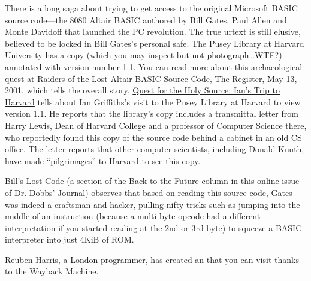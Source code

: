 There is a long saga about trying to get access to the original
Microsoft BASIC source code---the 8080 Altair BASIC authored by Bill
Gates, Paul Allen and Monte Davidoff that launched the PC revolution.
The true urtext is still elusive, believed to be locked in Bill Gates's
personal safe.
The Pusey Library at Harvard University has a copy (which you may
inspect but not photograph\ldots{}WTF?) annotated with version number
1.1.
You can read more about this archaeological quest at
\href{http://www.theregister.co.uk/2001/05/13/raiders_of_the_lost_altair/}{Raiders
of the Lost Altair BASIC Source Code}, The Register, May 13, 2001,
which tells the overall story.
\href{http://www.interact-sw.co.uk/altair/other\%20versions/ian.htm}{Quest
for the Holy Source: Ian's Trip to Harvard} tells about Ian
Griffiths's visit to the Pusey Library at Harvard to view version
1.1.
He reports that the library's copy includes a transmittal letter from
Harry Lewis, Dean of Harvard College and a professor of Computer
Science there, who reportedly found this copy of the source code behind
a cabinet in an old CS office.
The letter reports that other computer scientists, including Donald
Knuth, have made ``pilgrimages'' to Harvard to see this copy.

\href{http://www.drdobbs.com/back-to-the-future/184404733}{Bill's
  Lost Code} (a section of the Back to the Future column in this online
issue of Dr. Dobbs' Journal) observes that based on reading this source
code, Gates was indeed a craftsman and hacker, pulling nifty tricks such
as jumping into the middle of an instruction (because a multi-byte
opcode had a different interpretation if you started reading at the 2nd
or 3rd byte) to squeeze a BASIC interpreter into just 4KiB of ROM.

Reuben Harris, a London programmer, has created an
 that you can visit thanks to the
Wayback Machine.
